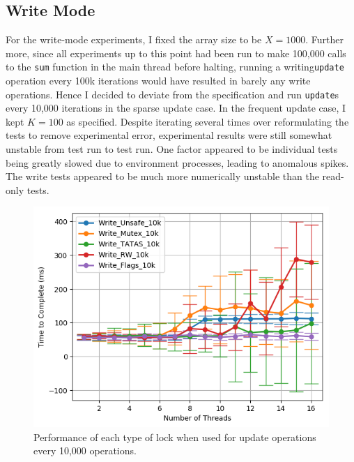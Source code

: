 \documentclass[11pt]{article}
\begin{document}
\subsection{Write Mode}


For the write-mode experiments, I fixed the array size to be $X = 1000$. Further more, since all experiments up to this point had been run to make 100,000 calls to the \texttt{sum} function in the main thread before halting, running a writing\texttt{update} operation every 100k iterations would have resulted in barely any write operations. Hence I decided to deviate from the specification and run \texttt{update}s every 10,000 iterations in the sparse update case.
In the frequent update case, I kept $K=100$ as specified. Despite iterating several times over reformulating the tests to remove experimental error, experimental results were still somewhat unstable from test run to test run. One factor appeared to be individual tests being greatly slowed due to environment processes, leading to anomalous spikes. The write tests appeared to be much more numerically unstable than the read-only tests.
\begin{figure}
\centering
\includegraphics[scale=0.65]{step7_1.png}
\caption{Performance of each type of lock when used for update operations every 10,000 operations.}
\label{fig:step7_1}
\end{figure}
\end{document}
